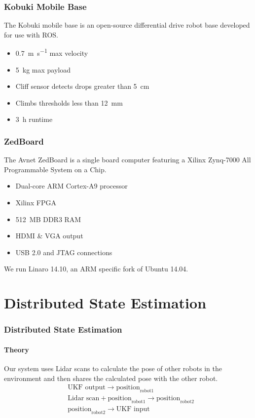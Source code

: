 \documentclass[14pt]{beamer}
\begin{document}
\begin{frame}
\frametitle{Kobuki Mobile Base}
The Kobuki mobile base is an open-source differential drive robot base developed for use with ROS.

\begin{itemize}
\item \SI{0.7}{\meter\per\second} max velocity
\item \SI{5}{\kilogram} max payload
\item Cliff sensor detects drops greater than \SI{5}{\cm}
\item Climbs thresholds less than \SI{12}{\mm}
\item \SI{3}{\hour} runtime
\end{itemize}
\end{frame}

\begin{frame}
\frametitle{ZedBoard}
The Avnet ZedBoard is a single board computer featuring a Xilinx Zynq-7000 All Programmable System on a Chip.
\begin{itemize}
\item Dual-core ARM Cortex-A9 processor
\item Xilinx FPGA
\item 512~MB DDR3 RAM
\item HDMI \& VGA output
\item USB 2.0 and JTAG connections
\end{itemize}

We run Linaro 14.10, an ARM specific fork of Ubuntu 14.04.
\end{frame}

\section{Distributed State Estimation}
\begin{frame}
\frametitle{Distributed State Estimation}
\framesubtitle{Theory}
Our system uses Lidar scans to calculate the pose of other robots in the environment and then shares the calculated pose with the other robot.
\begin{align}
&\text{UKF output} \rightarrow \text{position}_\text{robot1} \\
&\text{Lidar scan} + \text{position}_\text{robot1} \rightarrow \text{position}_\text{robot2} \\
&\text{position}_\text{robot2} \rightarrow \text{UKF input}
\end{align}
\end{frame}
\end{document}
